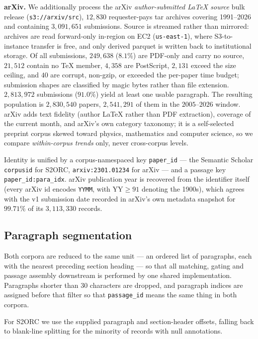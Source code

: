 \textbf{arXiv.} We additionally process the arXiv \emph{author-submitted
\LaTeX{} source} bulk release (\texttt{s3://arxiv/src}), $12{,}830$
requester-pays tar archives covering 1991--2026 and containing $3{,}091{,}651$
submissions. Source is streamed rather than mirrored: archives are read
forward-only in-region on EC2 (\texttt{us-east-1}), where S3-to-instance
transfer is free, and only derived parquet is written back to institutional
storage. Of all submissions, $249{,}638$ ($8.1\%$) are PDF-only and carry no
source, $21{,}512$ contain no \TeX{} member, $4{,}358$ are PostScript,
$2{,}131$ exceed the size ceiling, and $40$ are corrupt, non-gzip, or exceeded
the per-paper time budget; submission shapes are classified by magic bytes
rather than file extension. $2{,}813{,}972$ submissions ($91.0\%$) yield at
least one usable paragraph. The resulting population is $2{,}830{,}540$ papers,
$2{,}541{,}291$ of them in the $2005$--$2026$ window. arXiv adds text fidelity
(author \LaTeX{} rather than PDF extraction), coverage of the current month,
and arXiv's own category taxonomy; it is a self-selected preprint corpus skewed
toward physics, mathematics and computer science, so we compare
\emph{within-corpus trends} only, never cross-corpus levels.

Identity is unified by a corpus-namespaced key \texttt{paper\_id} --- the
Semantic Scholar \texttt{corpusid} for S2ORC, \texttt{arxiv:2301.01234} for
arXiv --- and a passage key \texttt{paper\_id:para\_idx}. arXiv
publication year is recovered from the identifier itself (every arXiv id
encodes \texttt{YYMM}, with $\mathrm{YY}\ge 91$ denoting the 1900s), which
agrees with the v1 submission date recorded in arXiv's own metadata snapshot
for $99.71\%$ of its $3{,}113{,}330$ records.

\subsection{Paragraph segmentation}

Both corpora are reduced to the same unit --- an ordered list of paragraphs, each
with the nearest preceding section heading --- so that all matching, gating and
passage assembly downstream is performed by one shared implementation.
Paragraphs shorter than 30 characters are dropped, and paragraph indices are
assigned before that filter so that \texttt{passage\_id} means the same thing in
both corpora.

For S2ORC we use the supplied paragraph and section-header offsets, falling back
to blank-line splitting for the minority of records with null annotations.

